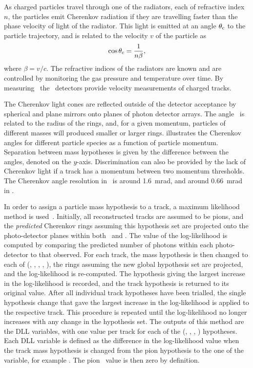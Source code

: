 As charged particles travel through one of the radiators, each of refractive 
index $n$, the particles emit Cherenkov radiation if they are travelling faster 
than the phase velocity of light of the radiator.
This light is emitted at an angle $\theta_{\textnormal{c}}$ to the particle trajectory, and is 
related to the velocity $v$ of the particle as
\begin{equation}
  \cos{\ensuremath{\theta_{\textnormal{c}}}} = \frac{1}{n\beta},
\end{equation}
where $\beta = v/c$.
The refractive indices of the radiators are known and are controlled by 
monitoring the gas pressure and temperature over time.
By measuring \thetac\ the \rich\ detectors provide velocity measurements of 
charged tracks.

The Cherenkov light cones are reflected outside of the \lhcb detector 
acceptance by spherical and plane mirrors onto planes of photon detector 
arrays.
The angle \thetac\ is related to the radius of the rings, and, for a given 
momentum, particles of different masses will produced smaller or larger rings.
 illustrates the Cherenkov angles for 
different particle species as a function of particle momentum.
Separation between mass hypotheses is given by the difference between the 
angles, denoted on the $y$-axis.
Discrimination can also be provided by the lack of Cherenkov light if a track 
has a momentum between two momentum thresholds.
The Cherenkov angle resolution in \richone\ is around \SI{1.6}{\milli\radian}, 
and around \SI{0.66}{\milli\radian} in \richtwo.

In order to assign a particle mass hypothesis to a track, a maximum likelihood 
method is used~\cite{Forty:1998eqa}.
Initially, all reconstructed tracks are assumed to be pions, and the 
\emph{predicted} Cherenkov rings assuming this hypothesis set are projected 
onto the photo-detector planes within both \richone\ and \richtwo.
The value of the log-likelihood is computed by comparing the predicted number 
of photons within each photo-detector to that observed.
For each track, the mass hypothesis is then changed to each of (\Pe, \Pmu, 
\Ppi, \PK, \Pproton), the rings assuming the new global hypothesis set are 
projected, and the log-likelihood is re-computed.
The hypothesis giving the largest increase in the log-likelihood is recorded, 
and the track hypothesis is returned to its original value.
After all individual track hypotheses have been trialled, the single hypothesis 
change that gave the largest increase in the log-likelihood is applied to the 
respective track.
This procedure is repeated until the log-likelihood no longer increases with 
any change in the hypothesis set.
The outputs of this method are the \ac{DLL} variables, with one value per track 
for each of the (\Pe, \Pmu, \PK, \Pproton) hypotheses.
Each \ac{DLL} variable is defined as the difference in the log-likelihood value 
when the track mass hypothesis is changed from the pion hypothesis to the one 
of the variable, for example \dllkpi.
The pion \dll\ value is then zero by definition.

